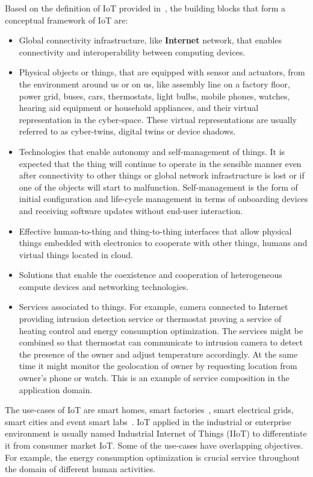 \documentclass[english, 12pt, a4paper, elec, utf8, online]{aaltothesis}
\begin{document}
Based on the definition of IoT provided in~\cite{AtzoriIM17}, the building blocks that form a conceptual framework of IoT are:
\begin{itemize}
\item
Global connectivity infrastructure, like \textbf{Internet} network, that enables connectivity and interoperability between computing devices.
\item
Physical objects or things, that are equipped with sensor and actuators, from the environment around us or on us, like assembly line on a factory floor, power grid, buses, cars, thermostats, light bulbs, mobile phones, watches, hearing aid equipment or household appliances, and their virtual representation in the cyber-space. These virtual representations are usually referred to as cyber-twins, digital twins or device shadows. 
\item
Technologies that enable autonomy and self-management of things. It is expected that the thing will continue to operate in the sensible manner even after connectivity to other things or global network infrastructure is lost or if one of the objects will start to malfunction. Self-management is the form of initial configuration and life-cycle management in terms of onboarding devices and receiving software updates without end-user interaction.
\item
Effective human-to-thing and thing-to-thing interfaces that allow physical things embedded with electronics to cooperate with other things, humans and virtual things located in cloud.  
\item
Solutions that enable the coexistence and cooperation of heterogeneous compute devices and networking technologies.
\item
Services associated to things. For example, camera connected to Internet providing intrusion detection service or thermostat proving a service of heating control and energy consumption optimization. The services might be combined so that thermostat can communicate to intrusion camera to detect the presence of the owner and adjust temperature accordingly. At the same time it might monitor the geolocation of owner by requesting location from owner's phone or watch. This is an example of service composition in the application domain. 
\end{itemize}

The use-cases of IoT are smart homes, smart factories~\cite{wang2016implementing}, smart electrical grids, smart cities and event smart labs~\cite{perkel2017internet}. IoT applied in the industrial or enterprise environment is usually named Industrial Internet of Things (IIoT) to differentiate it from consumer market IoT. Some of the use-cases have overlapping objectives. For example, the energy consumption optimization is crucial service throughout the domain of different human activities.
\end{document}
